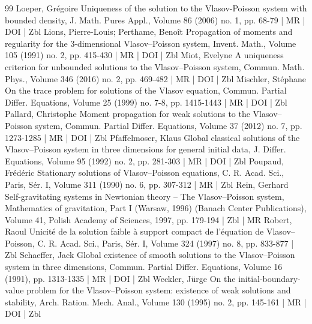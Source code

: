 \begin{thebibliography}{99}
Loeper, Grégoire Uniqueness of the solution to the Vlasov-Poisson system with bounded density, J. Math. Pures Appl., Volume 86 (2006) no. 1, pp. 68-79 | MR | DOI | Zbl
Lions, Pierre-Louis; Perthame, Benoît Propagation of moments and regularity for the 3-dimensional Vlasov–Poisson system, Invent. Math., Volume 105 (1991) no. 2, pp. 415-430 | MR | DOI | Zbl
Miot, Evelyne A uniqueness criterion for unbounded solutions to the Vlasov–Poisson system, Commun. Math. Phys., Volume 346 (2016) no. 2, pp. 469-482 | MR | DOI | Zbl
Mischler, Stéphane On the trace problem for solutions of the Vlasov equation, Commun. Partial Differ. Equations, Volume 25 (1999) no. 7-8, pp. 1415-1443 | MR | DOI | Zbl
Pallard, Christophe Moment propagation for weak solutions to the Vlasov–Poisson system, Commun. Partial Differ. Equations, Volume 37 (2012) no. 7, pp. 1273-1285 | MR | DOI | Zbl
Pfaffelmoser, Klaus Global classical solutions of the Vlasov–Poisson system in three dimensions for general initial data, J. Differ. Equations, Volume 95 (1992) no. 2, pp. 281-303 | MR | DOI | Zbl
Poupaud, Frédéric Stationary solutions of Vlasov–Poisson equations, C. R. Acad. Sci., Paris, Sér. I, Volume 311 (1990) no. 6, pp. 307-312 | MR | Zbl
Rein, Gerhard Self-gravitating systems in Newtonian theory – The Vlasov–Poisson system, Mathematics of gravitation, Part I (Warsaw, 1996) (Banach Center Publications), Volume 41, Polish Academy of Sciences, 1997, pp. 179-194 | Zbl | MR
Robert, Raoul Unicité de la solution faible à support compact de l’équation de Vlasov–Poisson, C. R. Acad. Sci., Paris, Sér. I, Volume 324 (1997) no. 8, pp. 833-877 | Zbl
Schaeffer, Jack Global existence of smooth solutions to the Vlasov–Poisson system in three dimensions, Commun. Partial Differ. Equations, Volume 16 (1991), pp. 1313-1335 | MR | DOI | Zbl
Weckler, Jürge On the initial-boundary-value problem for the Vlasov–Poisson system: existence of weak solutions and stability, Arch. Ration. Mech. Anal., Volume 130 (1995) no. 2, pp. 145-161 | MR | DOI | Zbl
\end{thebibliography}
